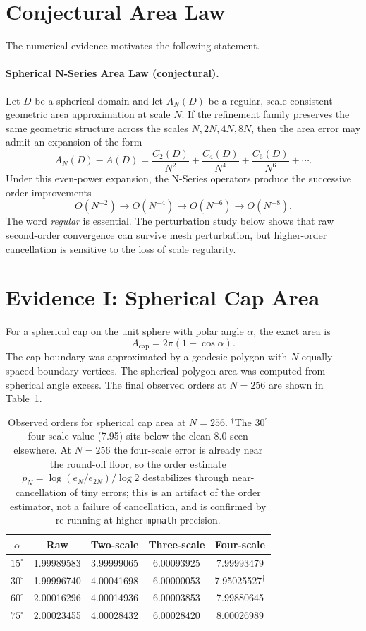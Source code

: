 \documentclass[11pt]{article}
\begin{document}
\section{Conjectural Area Law}
The numerical evidence motivates the following statement.

\paragraph{Spherical N-Series Area Law (conjectural).}
Let $D$ be a spherical domain and let $A_N(D)$ be a regular, scale-consistent geometric
area approximation at scale $N$. If the refinement family preserves the same geometric
structure across the scales $N,2N,4N,8N$, then the area error may admit an expansion of the
form
\[
A_N(D) - A(D) = \frac{C_2(D)}{N^2} + \frac{C_4(D)}{N^4} + \frac{C_6(D)}{N^6} + \cdots .
\]
Under this even-power expansion, the N-Series operators produce the successive order
improvements
\[
O(N^{-2}) \longrightarrow O(N^{-4}) \longrightarrow O(N^{-6}) \longrightarrow O(N^{-8}).
\]
The word \emph{regular} is essential. The perturbation study below shows that raw
second-order convergence can survive mesh perturbation, but higher-order cancellation is
sensitive to the loss of scale regularity.

\section{Evidence I: Spherical Cap Area}
For a spherical cap on the unit sphere with polar angle $\alpha$, the exact area is
\[
A_{\mathrm{cap}} = 2\pi(1 - \cos\alpha).
\]
The cap boundary was approximated by a geodesic polygon with $N$ equally spaced boundary
vertices. The spherical polygon area was computed from spherical angle excess. The final
observed orders at $N=256$ are shown in Table~\ref{tab:cap}.

\begin{table}[h]
\centering
\begin{tabular}{ccccc}
\toprule
$\alpha$ & Raw & Two-scale & Three-scale & Four-scale \\
\midrule
$15^\circ$ & 1.99989583 & 3.99999065 & 6.00093925 & 7.99993479 \\
$30^\circ$ & 1.99996740 & 4.00041698 & 6.00000053 & 7.95025527$^{\dagger}$ \\
$60^\circ$ & 2.00016296 & 4.00014936 & 6.00003853 & 7.99880645 \\
$75^\circ$ & 2.00023455 & 4.00028432 & 6.00028420 & 8.00026989 \\
\bottomrule
\end{tabular}
\caption{Observed orders for spherical cap area at $N=256$.
$^{\dagger}$The $30^\circ$ four-scale value (7.95) sits below the clean $8.0$ seen
elsewhere. At $N=256$ the four-scale error is already near the round-off floor, so the
order estimate $p_N=\log(e_N/e_{2N})/\log 2$ destabilizes through near-cancellation of tiny
errors; this is an artifact of the order estimator, not a failure of cancellation, and is
confirmed by re-running at higher \texttt{mpmath} precision.}
\label{tab:cap}
\end{table}
\end{document}
